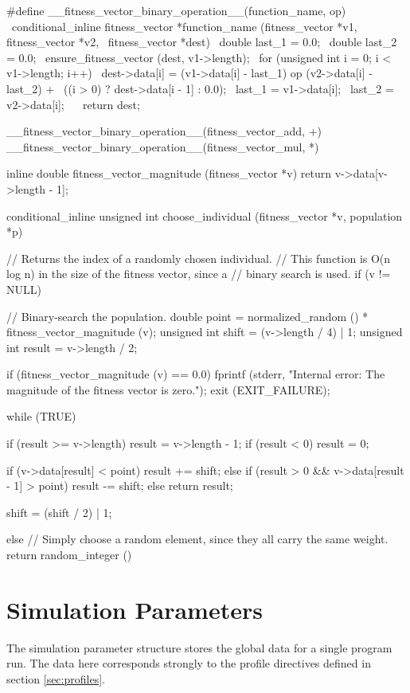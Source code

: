 \documentclass{article}
\begin{document}
\begin{ccode}
#define __fitness_vector_binary_operation__(function_name, op) \
conditional_inline fitness_vector *function_name (fitness_vector *v1, fitness_vector *v2, \
						  fitness_vector *dest) { \
  double last_1 = 0.0; \
  double last_2 = 0.0; \
  ensure_fitness_vector (dest, v1->length); \
  for (unsigned int i = 0; i < v1->length; i++) { \
   dest->data[i] = (v1->data[i] - last_1) op (v2->data[i] - last_2) + \
     ((i > 0) ? dest->data[i - 1] : 0.0); \
   last_1 = v1->data[i]; \
   last_2 = v2->data[i]; \
  } \
  return dest; \
}

__fitness_vector_binary_operation__(fitness_vector_add, +)
__fitness_vector_binary_operation__(fitness_vector_mul, *)

inline double fitness_vector_magnitude (fitness_vector *v)
  {return v->data[v->length - 1];}

conditional_inline unsigned int choose_individual (fitness_vector *v, population *p) {
  // Returns the index of a randomly chosen individual.
  // This function is O(n log n) in the size of the fitness vector, since a
  // binary search is used.
  if (v != NULL) {
    // Binary-search the population.
    double		point 	= normalized_random () * fitness_vector_magnitude (v);
    unsigned int	shift 	= (v->length / 4) | 1;
    unsigned int	result 	= v->length / 2;

    if (fitness_vector_magnitude (v) == 0.0) {
      fprintf (stderr, "Internal error: The magnitude of the fitness vector is zero.\n");
      exit (EXIT_FAILURE);
    }

    while (TRUE) {
      if (result >= v->length)	result = v->length - 1;
      if (result < 0)		result = 0;

      if (v->data[result] < point)
	result += shift;
      else if (result > 0 && v->data[result - 1] > point)
	result -= shift;
      else
	return result;

      shift = (shift / 2) | 1;
    }
  } else
    // Simply choose a random element, since they all carry the same weight.
    return random_integer () %
}
\end{ccode}

  \section{Simulation Parameters}
    \label{sec:simulation-parameters}
    
    The simulation parameter structure stores the global data for a single
    program run. The data here corresponds strongly to the profile directives
    defined in section \ref{sec:profiles}.
\end{document}
